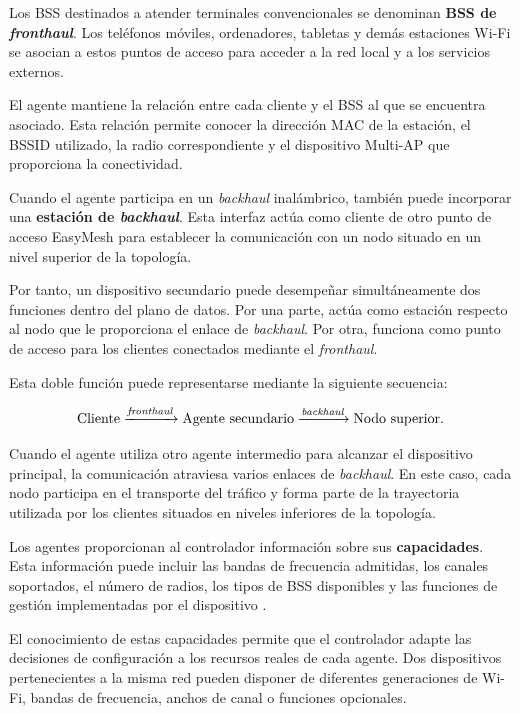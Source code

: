 Los BSS destinados a atender terminales convencionales se denominan
\textbf{BSS de \textit{fronthaul}}. Los teléfonos móviles, ordenadores,
tabletas y demás estaciones Wi-Fi se asocian a estos puntos de acceso para
acceder a la red local y a los servicios externos.

El agente mantiene la relación entre cada cliente y el BSS al que se
encuentra asociado. Esta relación permite conocer la dirección MAC de la
estación, el BSSID utilizado, la radio correspondiente y el dispositivo
Multi-AP que proporciona la conectividad.

Cuando el agente participa en un \textit{backhaul} inalámbrico, también
puede incorporar una \textbf{estación de \textit{backhaul}}. Esta
interfaz actúa como cliente de otro punto de acceso EasyMesh para
establecer la comunicación con un nodo situado en un nivel superior de la
topología.

Por tanto, un dispositivo secundario puede desempeñar simultáneamente dos
funciones dentro del plano de datos. Por una parte, actúa como estación
respecto al nodo que le proporciona el enlace de
\textit{backhaul}. Por otra, funciona como punto de acceso para los
clientes conectados mediante el \textit{fronthaul}.

Esta doble función puede representarse mediante la siguiente secuencia:

\[
    \text{Cliente}
    \xrightarrow{\text{\textit{fronthaul}}}
    \text{Agente secundario}
    \xrightarrow{\text{\textit{backhaul}}}
    \text{Nodo superior}.
\]

Cuando el agente utiliza otro agente intermedio para alcanzar el
dispositivo principal, la comunicación atraviesa varios enlaces de
\textit{backhaul}. En este caso, cada nodo participa en el transporte del
tráfico y forma parte de la trayectoria utilizada por los clientes
situados en niveles inferiores de la topología.

Los agentes proporcionan al controlador información sobre sus
\textbf{capacidades}. Esta información puede incluir las bandas de
frecuencia admitidas, los canales soportados, el número de radios, los
tipos de BSS disponibles y las funciones de gestión implementadas por el
dispositivo \cite{wifi_alliance_easymesh}.

El conocimiento de estas capacidades permite que el controlador adapte
las decisiones de configuración a los recursos reales de cada agente.
Dos dispositivos pertenecientes a la misma red pueden disponer de
diferentes generaciones de Wi-Fi, bandas de frecuencia, anchos de canal o
funciones opcionales.

